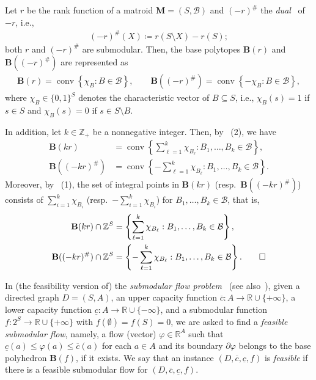 \documentclass[a4paper,11pt]{article}
\numberwithin{equation}{section}
\newcommand{\R}{\mathbb{R}}
\newcommand{\Z}{\mathbb{Z}}
\newcommand{\BB}{\mathbf{B}}
\newcommand{\M}{\mathbf{M}}
\DeclareMathOperator{\conv}{conv}
\begin{document}
\begin{example}\label{ex:base-polyhedron}
Let $r$ be the rank function of a matroid $\M = (S, \mathcal{B})$
and $(-r)^\#$ the \emph{dual}~\cite[Section~2.3]{Fujishige2005} of $-r$, i.e.,
\begin{align}
    (-r)^\#(X) \coloneqq r(S \setminus X) - r(S);
\end{align}
both $r$ and $(-r)^\#$ are submodular.
Then, the base polytopes $\BB(r)$ and $\BB((-r)^\#)$ are represented as
\begin{align}
    \BB(r) = \conv \left\{ \chi_{B} : B \in \mathcal{B} \right\}, \qquad \BB((-r)^\#) = \conv \left\{ -\chi_{B} : B \in \mathcal{B} \right\},
\end{align}
where $\chi_B \in \{0,1\}^S$ denotes the characteristic vector of $B \subseteq S$,
i.e.,
$\chi_B(s) = 1$ if $s \in S$ and $\chi_B(s) = 0$ if $s \in S \setminus B$.

In addition, let $k \in \Z_+$ be a nonnegative integer.
Then, by ~(2), we have
\begin{align}
    \BB(kr) &= \conv \left\{ \sum_{\ell = 1}^k \chi_{B_\ell} : B_1, \dots, B_k \in \mathcal{B} \right\},\\
    \BB((-kr)^\#) &= \conv \left\{ - \sum_{\ell = 1}^k \chi_{B_\ell} : B_1, \dots, B_k \in \mathcal{B} \right\}.
\end{align}
Moreover, by ~(1), the set of integral points in $\BB(kr)$ (resp.\ $\BB((-kr)^\#)$) consists of $\sum_{i = 1}^k \chi_{B_i}$ (resp.\ $- \sum_{i = 1}^k \chi_{B_i}$) for $B_1, \dots, B_k \in \mathcal{B}$, that is,
\begin{align}
    \BB(kr) \cap \Z^S &= \left\{ \sum_{\ell = 1}^k \chi_{B_\ell} : B_1, \dots, B_k \in \mathcal{B} \right\},\\
    \BB((-kr)^\#) \cap \Z^S &= \left\{ - \sum_{\ell = 1}^k \chi_{B_\ell} : B_1, \dots, B_k \in \mathcal{B}\right\}. \qedhere
\end{align}
\end{example}




In (the feasibility version of) the \emph{submodular flow problem}~\cite{Edmonds1977} (see also~\cite[Section~5.1]{Fujishige2005}),
given a directed graph $D = (S, A)$, an upper capacity function $\overline{c} : A \to \R \cup \{+\infty\}$, a lower capacity function $\underline{c} : A \to \R \cup \{-\infty\}$, and a submodular function $f : 2^S \to \R \cup \{+\infty\}$ with $f(\emptyset) = f(S) = 0$,
we are asked to find a \emph{feasible submodular flow}, namely,
a flow (vector) $\varphi \in \R^A$ such that
$\underline{c}(a) \leq \varphi(a) \leq \overline{c}(a)$ for each $a \in A$
and its boundary $\partial \varphi$ belongs to the base polyhedron $\BB(f)$,
if it exists.
We say that an instance $(D, \overline{c}, \underline{c}, f)$ is \emph{feasible} if there is a feasible submodular flow for $(D, \overline{c}, \underline{c}, f)$.
\end{document}
